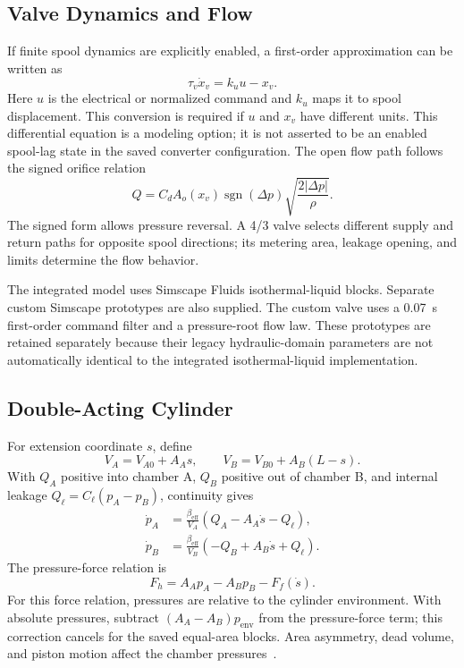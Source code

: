 \documentclass[conference,letterpaper]{IEEEtran}
\begin{document}
\subsection{Valve Dynamics and Flow}
If finite spool dynamics are explicitly enabled, a first-order approximation can be written as
\begin{equation}
\tau_v\dot x_v=k_uu-x_v.
\end{equation}
Here $u$ is the electrical or normalized command and $k_u$ maps it to spool displacement. This conversion is required if $u$ and $x_v$ have different units. This differential equation is a modeling option; it is not asserted to be an enabled spool-lag state in the saved converter configuration. The open flow path follows the signed orifice relation
\begin{equation}
Q=C_dA_o(x_v)\operatorname{sgn}(\Delta p)
\sqrt{\frac{2|\Delta p|}{\rho}}.
\end{equation}
The signed form allows pressure reversal. A 4/3 valve selects different supply and return paths for opposite spool directions; its metering area, leakage opening, and limits determine the flow behavior.

The integrated model uses Simscape Fluids isothermal-liquid blocks. Separate custom Simscape prototypes are also supplied. The custom valve uses a 0.07~s first-order command filter and a pressure-root flow law. These prototypes are retained separately because their legacy hydraulic-domain parameters are not automatically identical to the integrated isothermal-liquid implementation.

\subsection{Double-Acting Cylinder}
For extension coordinate $s$, define
\begin{equation}
V_A=V_{A0}+A_As,\qquad
V_B=V_{B0}+A_B(L-s).
\end{equation}
With $Q_A$ positive into chamber A, $Q_B$ positive out of chamber B, and internal leakage $Q_\ell=C_\ell(p_A-p_B)$, continuity gives
\begin{align}
\dot p_A&=\frac{\beta_{\mathrm{eff}}}{V_A}
(Q_A-A_A\dot s-Q_\ell),\\
\dot p_B&=\frac{\beta_{\mathrm{eff}}}{V_B}
(-Q_B+A_B\dot s+Q_\ell).
\end{align}
The pressure-force relation is
\begin{equation}
F_h=A_Ap_A-A_Bp_B-F_f(\dot s).
\end{equation}
For this force relation, pressures are relative to the cylinder environment. With absolute pressures, subtract $(A_A-A_B)p_{\mathrm{env}}$ from the pressure-force term; this correction cancels for the saved equal-area blocks. Area asymmetry, dead volume, and piston motion affect the chamber pressures~\cite{actuator}.
\end{document}
